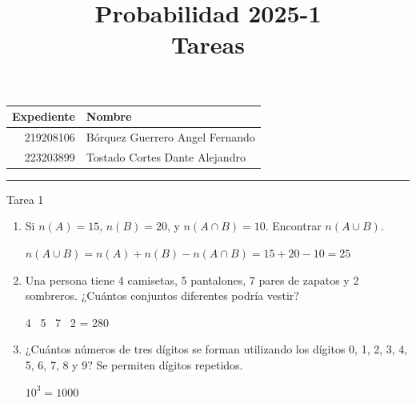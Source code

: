 \documentclass[a4paper, 12pt]{article}
\title
{
  Probabilidad 2025-1 \\
  Tareas
}
\newcommand{\Pspace}{0.5cm}
\newcommand{\Aspace}{0.2cm}
\begin{document}
\maketitle

\begin{center}
    \begin{tabular}{r|l}
        \textbf{Expediente} & \textbf{Nombre} \\ \hline
        219208106 & Bórquez Guerrero Angel Fernando \\
        223203899 & Tostado Cortes Dante Alejandro \\
    \end{tabular}
\end{center}

\rule{\linewidth}{0.3mm}



\vspace{0.3cm}

\begin{center}
    { \LARGE Tarea 1}
\end{center}

\begin{enumerate}
    \item Si $n(A) = 15$, $n(B) = 20$, y $n(A \cap B) = 10$. Encontrar $n(A \cup B).$ 
    \vspace{\Aspace} \par
        { \color{azul} $n(A \cup B) = n(A) + n(B) - n(A \cap B) = 15 + 20 - 10 = 25$ }


    \vspace{\Pspace}
    \item Una persona tiene 4 camisetas, 5 pantalones, 7 pares de zapatos y 2 sombreros. ¿Cuántos conjuntos diferentes podría vestir?
    \vspace{\Aspace} \par
    { \color{azul} 4 \cdot\ 5 \cdot\ 7 \cdot\ 2 = 280 }


    \vspace{\Pspace}
    \item ¿Cuántos números de tres dígitos se forman utilizando los dígitos 0, 1, 2, 3, 4, 5, 6, 7, 8 y 9? Se permiten dígitos repetidos.
    \vspace{\Aspace} \par
        { \color{azul} $10^{3} = 1000$ } 
\end{enumerate}
\end{document}
